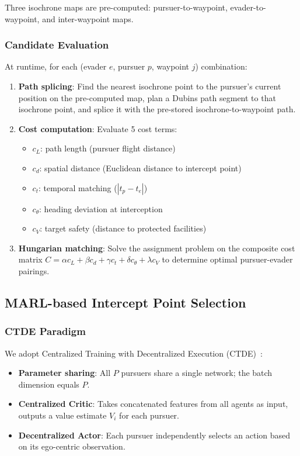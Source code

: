 \documentclass[10pt,conference]{IEEEtran}
\begin{document}
Three isochrone maps are pre-computed: pursuer-to-waypoint, evader-to-waypoint, and inter-waypoint maps.

\subsubsection{Candidate Evaluation}

At runtime, for each (evader $e$, pursuer $p$, waypoint $j$) combination:

\begin{enumerate}
    \item \textbf{Path splicing}: Find the nearest isochrone point to the pursuer's current position on the pre-computed map, plan a Dubins path segment to that isochrone point, and splice it with the pre-stored isochrone-to-waypoint path.
    \item \textbf{Cost computation}: Evaluate 5 cost terms:
    \begin{itemize}
        \item $c_L$: path length (pursuer flight distance)
        \item $c_d$: spatial distance (Euclidean distance to intercept point)
        \item $c_t$: temporal matching ($|t_p - t_e|$)
        \item $c_\theta$: heading deviation at interception
        \item $c_V$: target safety (distance to protected facilities)
    \end{itemize}
    \item \textbf{Hungarian matching}: Solve the assignment problem on the composite cost matrix $C = \alpha c_L + \beta c_d + \gamma c_t + \delta c_\theta + \lambda c_V$ to determine optimal pursuer-evader pairings.
\end{enumerate}

\subsection{MARL-based Intercept Point Selection}

\subsubsection{CTDE Paradigm}

We adopt Centralized Training with Decentralized Execution (CTDE)~\cite{yu2022surprising}:
\begin{itemize}
    \item \textbf{Parameter sharing}: All $P$ pursuers share a single network; the batch dimension equals $P$.
    \item \textbf{Centralized Critic}: Takes concatenated features from all agents as input, outputs a value estimate $V_i$ for each pursuer.
    \item \textbf{Decentralized Actor}: Each pursuer independently selects an action based on its ego-centric observation.
\end{itemize}
\end{document}
